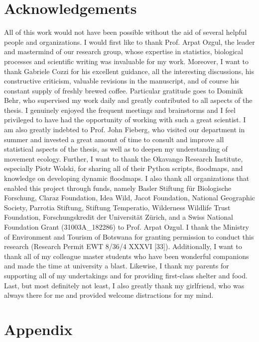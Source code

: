 \documentclass[abstract=on,10pt,a4paper,bibliography=totocnumbered]{scrartcl}
\begin{document}
\section{Acknowledgements}
All of this work would not have been possible without the aid of several helpful
people and organizations. I would first like to thank Prof. Arpat Ozgul, the
leader and mastermind of our research group, whose expertise in statistics,
biological processes and scientific writing was invaluable for my work.
Moreover, I want to thank Gabriele Cozzi for his excellent guidance, all the
interesting discussions, his constructive criticism, valuable revisions in the
manuscript, and of course his constant supply of freshly brewed coffee.
Particular gratitude goes to Dominik Behr, who supervised my work daily and
greatly contributed to all aspects of the thesis. I genuinely enjoyed the
frequent meetings and brainstorms and I feel privileged to have had the
opportunity of working with such a great scientist. I am also greatly indebted
to Prof. John Fieberg, who visited our department in summer and invested a great
amount of time to consult and improve all statistical aspects of the thesis, as
well as to deepen my understanding of movement ecology. Further, I want to thank
the Okavango Research Institute, especially Piotr Wolski, for sharing all of
their Python scripts, floodmaps, and knowledge on developing dynamic floodmaps.
I also thank all organizations that enabled this project through funds, namely
Basler Stiftung für Biologische Forschung, Claraz Foundation, Idea Wild, Jacot
Foundation, National Geographic Society, Parrotia Stiftung, Stiftung Temperatio,
Wilderness Wildlife Trust Foundation, Forschungskredit der Universität Zürich,
and a Swiss National Foundation Grant (31003A\_182286) to Prof. Arpat Ozgul. I
thank the Ministry of Environment and Tourism of Botswana for granting
permission to conduct this research (Research Permit EWT 8/36/4 XXXVI [33]).
Additionally, I want to thank all of my colleague master students who have been
wonderful companions and made the time at university a blast. Likewise, I thank
my parents for supporting all of my undertakings and for providing first-class
shelter and food. Last, but most definitely not least, I also greatly thank my
girlfriend, who was always there for me and provided welcome distractions for my
mind.

\newpage
\begingroup
\singlespacing

\endgroup

\newpage
\appendix
\section{Appendix}
\end{document}
